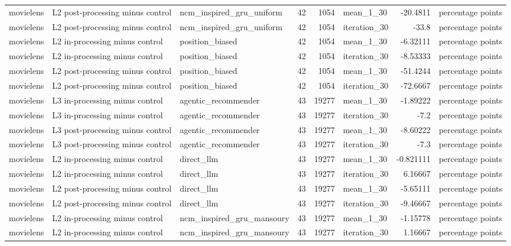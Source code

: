 \begin{table}[htbp!]
\begin{tabular}{lllrrlrl}
movielens & L2 post-processing minus control & ncm\_inspired\_gru\_uniform & 42 & 1054 & mean\_1\_30 & -20.4811 & percentage points \\
movielens & L2 post-processing minus control & ncm\_inspired\_gru\_uniform & 42 & 1054 & iteration\_30 & -33.8 & percentage points \\
movielens & L2 in-processing minus control & position\_biased & 42 & 1054 & mean\_1\_30 & -6.32111 & percentage points \\
movielens & L2 in-processing minus control & position\_biased & 42 & 1054 & iteration\_30 & -8.53333 & percentage points \\
movielens & L2 post-processing minus control & position\_biased & 42 & 1054 & mean\_1\_30 & -51.4244 & percentage points \\
movielens & L2 post-processing minus control & position\_biased & 42 & 1054 & iteration\_30 & -72.6667 & percentage points \\
movielens & L3 in-processing minus control & agentic\_recommender & 43 & 19277 & mean\_1\_30 & -1.89222 & percentage points \\
movielens & L3 in-processing minus control & agentic\_recommender & 43 & 19277 & iteration\_30 & -7.2 & percentage points \\
movielens & L3 post-processing minus control & agentic\_recommender & 43 & 19277 & mean\_1\_30 & -8.60222 & percentage points \\
movielens & L3 post-processing minus control & agentic\_recommender & 43 & 19277 & iteration\_30 & -7.3 & percentage points \\
movielens & L2 in-processing minus control & direct\_llm & 43 & 19277 & mean\_1\_30 & -0.821111 & percentage points \\
movielens & L2 in-processing minus control & direct\_llm & 43 & 19277 & iteration\_30 & 6.16667 & percentage points \\
movielens & L2 post-processing minus control & direct\_llm & 43 & 19277 & mean\_1\_30 & -5.65111 & percentage points \\
movielens & L2 post-processing minus control & direct\_llm & 43 & 19277 & iteration\_30 & -9.46667 & percentage points \\
movielens & L2 in-processing minus control & ncm\_inspired\_gru\_mansoury & 43 & 19277 & mean\_1\_30 & -1.15778 & percentage points \\
movielens & L2 in-processing minus control & ncm\_inspired\_gru\_mansoury & 43 & 19277 & iteration\_30 & 1.16667 & percentage points \\

\end{tabular}
\end{table}
